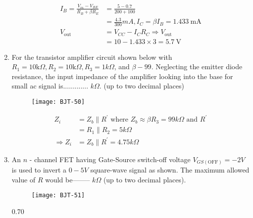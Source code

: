 \begin{enumerate}
\begin{answer}
\begin{align*}
I_{B}=\frac{V_{i n}-V_{B E}}{R_{B}+\beta R_{E}}&=\frac{5-0.7}{200+100}\\&=\frac{4.3}{300} m A, I_{C}=\beta I_{B}=1.433 \mathrm{~mA}\\
V_{\text {out }}&=V_{C C}-I_{C} R_{C} \Rightarrow V_{\text {out }}\\&=10-1.433 \times 3=5.7 \mathrm{~V}
\end{align*}
\end{answer}
	\item For the transistor amplifier circuit shown below with $R_{1}=10 \mathrm{k} \Omega, R_{2}=10 \mathrm{k} \Omega, R_{3}=1 k \Omega$, and $\beta-99$. Neglecting the emitter diode resistance, the input impedance of the amplifier looking into the base for small ac signal is............. $k \Omega$. (up to two decimal places)
{	}
\begin{figure}[H]
\centering
\texttt{[image: BJT-50]}
\end{figure}
\begin{answer}
\begin{align*}
Z_{i}&=Z_{b} \| R^{\prime}\text{ where }Z_{b} \approx \beta R_{3}=99 k \Omega\text{ and } R^{\prime}\\&=R_{1} \| R_{2}=5 k \Omega\\
\Rightarrow Z_{i}&=Z_{b} \| R^{\prime}=4.75 k \Omega
\end{align*}
\end{answer}
\item An $n$ - channel FET having Gate-Source switch-off voltage $V_{G S(\mathrm{OFF})}=-2 V$ is used to invert a $0-5 V$ square-wave signal as shown. The maximum allowed value of $R$ would be-------- $k \Omega$ (up to two decimal places).
{}
\begin{figure}[H]
\centering
\texttt{[image: BJT-51]}
\end{figure}
\begin{answer}
0.70
\end{answer}
\end{enumerate}